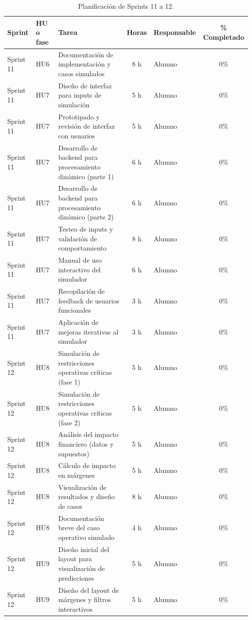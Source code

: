 \documentclass[
11pt, %
]{charter}
\begin{document}
\begin{table}[htpb]
\centering
\caption{Planificación de Sprints 11 a 12.}
\begin{tabularx}{\linewidth}{@{}|l|l|X|c|l|c|@{}}
\hline
\rowcolor[HTML]{C0C0C0}
Sprint & HU o fase & Tarea & Horas & Responsable & \% Completado \\ \hline
Sprint 11 & HU6 & Documentación de implementación y casos simulados & 8 h & Alumno & 0\% \\ \hline
Sprint 11 & HU7 & Diseño de interfaz para inputs de simulación & 5 h & Alumno & 0\% \\ \hline
Sprint 11 & HU7 & Prototipado y revisión de interfaz con usuarios & 5 h & Alumno & 0\% \\ \hline
Sprint 11 & HU7 & Desarrollo de backend para procesamiento dinámico (parte 1) & 6 h & Alumno & 0\% \\ \hline
Sprint 11 & HU7 & Desarrollo de backend para procesamiento dinámico (parte 2) & 6 h & Alumno & 0\% \\ \hline
Sprint 11 & HU7 & Testeo de inputs y validación de comportamiento & 8 h & Alumno & 0\% \\ \hline
Sprint 11 & HU7 & Manual de uso interactivo del simulador & 6 h & Alumno & 0\% \\ \hline
Sprint 11 & HU7 & Recopilación de feedback de usuarios funcionales & 3 h & Alumno & 0\% \\ \hline
Sprint 11 & HU7 & Aplicación de mejoras iterativas al simulador & 3 h & Alumno & 0\% \\ \hline
\hline
Sprint 12 & HU8 & Simulación de restricciones operativas críticas (fase 1) & 5 h & Alumno & 0\% \\ \hline
Sprint 12 & HU8 & Simulación de restricciones operativas críticas (fase 2) & 5 h & Alumno & 0\% \\ \hline
Sprint 12 & HU8 & Análisis del impacto financiero (datos y supuestos) & 5 h & Alumno & 0\% \\ \hline
Sprint 12 & HU8 & Cálculo de impacto en márgenes & 5 h & Alumno & 0\% \\ \hline
Sprint 12 & HU8 & Visualización de resultados y diseño de casos & 8 h & Alumno & 0\% \\ \hline
Sprint 12 & HU8 & Documentación breve del caso operativo simulado & 4 h & Alumno & 0\% \\ \hline
Sprint 12 & HU9 & Diseño inicial del layout para visualización de predicciones & 5 h & Alumno & 0\% \\ 
Sprint 12 & HU9 & Diseño del layout de márgenes y filtros interactivos & 5 h & Alumno & 0\% \\ \hline
\end{tabularx}
\end{table}
\end{document}
